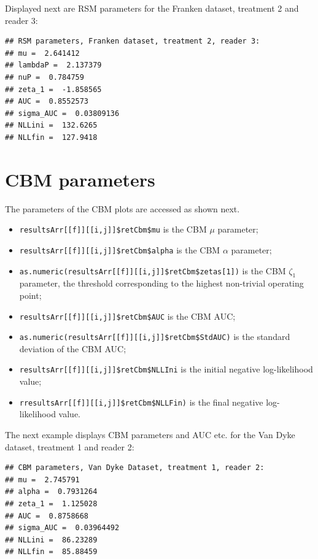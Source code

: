 \documentclass[
]{book}
\providecommand{\tightlist}{%
  \setlength{\itemsep}{0pt}\setlength{\parskip}{0pt}}
\begin{document}
Displayed next are RSM parameters for the Franken dataset, treatment 2 and reader 3:

\begin{verbatim}
## RSM parameters, Franken dataset, treatment 2, reader 3: 
## mu =  2.641412 
## lambdaP =  2.137379 
## nuP =  0.784759 
## zeta_1 =  -1.858565 
## AUC =  0.8552573 
## sigma_AUC =  0.03809136 
## NLLini =  132.6265 
## NLLfin =  127.9418
\end{verbatim}

\hypertarget{rsm-3-fits-cbm-parameters}{%
\section{CBM parameters}\label{rsm-3-fits-cbm-parameters}}

The parameters of the CBM plots are accessed as shown next.

\begin{itemize}
\tightlist
\item
  \texttt{resultsArr{[}{[}f{]}{]}{[}{[}i,j{]}{]}\$retCbm\$mu} is the CBM \(\mu\) parameter;
\item
  \texttt{resultsArr{[}{[}f{]}{]}{[}{[}i,j{]}{]}\$retCbm\$alpha} is the CBM \(\alpha\) parameter;\\
\item
  \texttt{as.numeric(resultsArr{[}{[}f{]}{]}{[}{[}i,j{]}{]}\$retCbm\$zetas{[}1{]})} is the CBM \(\zeta_1\) parameter, the threshold corresponding to the highest non-trivial operating point;
\item
  \texttt{resultsArr{[}{[}f{]}{]}{[}{[}i,j{]}{]}\$retCbm\$AUC} is the CBM AUC;
\item
  \texttt{as.numeric(resultsArr{[}{[}f{]}{]}{[}{[}i,j{]}{]}\$retCbm\$StdAUC)} is the standard deviation of the CBM AUC;
\item
  \texttt{resultsArr{[}{[}f{]}{]}{[}{[}i,j{]}{]}\$retCbm\$NLLIni} is the initial negative log-likelihood value;
\item
  \texttt{rresultsArr{[}{[}f{]}{]}{[}{[}i,j{]}{]}\$retCbm\$NLLFin)} is the final negative log-likelihood value.
\end{itemize}

The next example displays CBM parameters and AUC etc. for the Van Dyke dataset, treatment 1 and reader 2:

\begin{verbatim}
## CBM parameters, Van Dyke Dataset, treatment 1, reader 2: 
## mu =  2.745791 
## alpha =  0.7931264 
## zeta_1 =  1.125028 
## AUC =  0.8758668 
## sigma_AUC =  0.03964492 
## NLLini =  86.23289 
## NLLfin =  85.88459
\end{verbatim}
\end{document}
